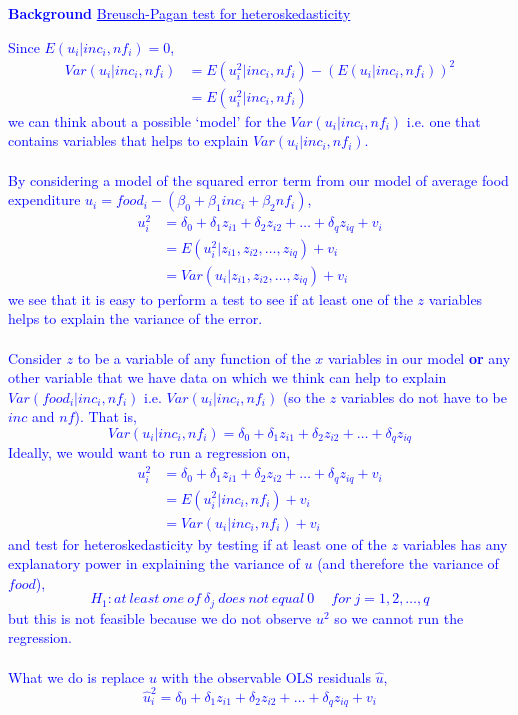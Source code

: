 \documentclass[12pt]{report}
\newenvironment{blueframed}[1][blue]
{\def\FrameCommand{\fboxsep=\FrameSep\fcolorbox{#1}{white}}%
\MakeFramed {\advance\hsize-\width \FrameRestore}}
{\endMakeFramed}
\begin{document}
\newpage
\justify
\begin{blueframed}
	\textcolor{blue}{\textbf{Background}}
	\vspace{-\baselineskip}
	\justify
	\textcolor{blue}{\underline{Breusch-Pagan test for heteroskedasticity}}
	
	\noindent \textcolor{blue}
	{
		\noindent Since $E(u_i|inc_i,nf_i)=0$, 
		\begin{align*}
		Var(u_i|inc_i,nf_i) &= E(u^2_i|inc_i,nf_i) - (E(u_i|inc_i,nf_i))^2 \\
		&= E(u^2_i|inc_i,nf_i)
		\end{align*}
		\noindent we can think about a possible `model' for the $Var(u_i|inc_i,nf_i)$ i.e. one that contains variables that helps to explain $Var(u_i|inc_i,nf_i)$. \\ \\ By considering a model of the squared error term from our model of average food expenditure $u_i = food_i - (\beta_0 + \beta_1 inc_i + \beta_2 nf_i)$, 
		\begin{align*}
		u^2_i &= \delta_0 + \delta_1z_{i1} + \delta_2z_{i2} + \dots + \delta_qz_{iq} + v_i \\
		&= E(u^2_i|z_{i1},z_{i2},\dots,z_{iq}) + v_i \\ 
		&= Var(u_i|z_{i1},z_{i2},\dots,z_{iq}) + v_i
		\end{align*} we see that it is easy to perform a test to see if at least one of the $z$ variables helps to explain the variance of the error.
		\\ \\ Consider $z$ to be a variable of any function of the $x$ variables in our model \textbf{or} any other variable that we have data on which we think can help to explain $Var(food_i|inc_i,nf_i)$ i.e. $Var(u_i|inc_i,nf_i)$ (so the $z$ variables do not have to be $inc$ and $nf$). That is, $$Var(u_i|inc_i,nf_i) = \delta_0 + \delta_1z_{i1} + \delta_2z_{i2} + \dots + \delta_qz_{iq}$$
		\noindent Ideally, we would want to run a regression on,
		\begin{align*}
		u^2_i &= \delta_0 + \delta_1z_{i1} + \delta_2z_{i2} + \dots + \delta_qz_{iq} + v_i \\
		&= E(u^2_i|inc_i,nf_i) + v_i \\
		&= Var(u_i|inc_i,nf_i) + v_i
		\end{align*}
		\noindent and test for heteroskedasticity by testing if at least one of the $z$ variables has any explanatory power in explaining the variance of $u$ (and therefore the variance of $food$), $$H_1: at\ least\ one\ of\ \delta_j\ does\ not\ equal\ 0\ \quad for\ j=1,2,\dots,q$$ but this is not feasible because we do not observe $u^2$ so we cannot run the regression.
		\\ \\ What we do is replace $u$ with the observable OLS residuals $\hat{u}$,
		$$\hat{u}^2_i = \delta_0 + \delta_1z_{i1} + \delta_2z_{i2} + \dots + \delta_qz_{iq} + v_i$$
	}
\end{blueframed}
\end{document}
